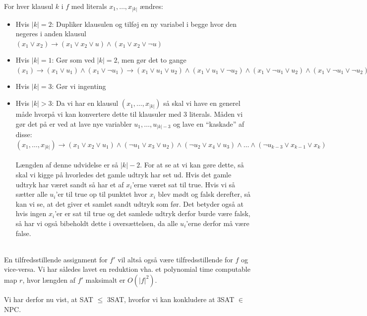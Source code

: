 For hver klausul $k$ i $f$ med literals $x_1, \hdots, x_{|k|}$ ændres:
\begin{itemize}
\item Hvis $|k| = 2$: Dupliker klausulen og tilføj en ny variabel i
begge hvor den negeres i anden klausul \\ $(x_1 \vee x_2) \rightarrow
(x_1 \vee x_2 \vee u) \wedge (x_1 \vee x_2 \vee \neg u)$
\item Hvis $|k| = 1$: Gør som ved $|k| = 2$, men gør det to gange \\
  $(x_1) \rightarrow (x_1 \vee u_1) \wedge (x_1 \vee \neg u_1)
  \rightarrow (x_1 \vee u_1 \vee u_2) \wedge (x_1 \vee u_1 \vee \neg
  u_2) \wedge (x_1 \vee \neg u_1 \vee u_2) \wedge (x_1 \vee \neg u_1
  \vee \neg u_2)$
\item Hvis $|k| = 3$: Gør vi ingenting
\item Hvis $|k| > 3$: Da vi har en klausul $(x_1,\hdots,x_{|k|})$ så
  skal vi have en generel måde hvorpå vi kan konvertere dette til
  klausuler med 3 literals. Måden vi gør det på er ved at lave nye
  variabler $u_1,\hdots,u_{|k|-3}$ og lave en ``kaskade'' af disse:\\
  $(x_1,\hdots,x_{|k|}) \rightarrow (x_1 \vee x_2 \vee u_1) \wedge
  (\neg u_1 \vee x_3 \vee u_2) \wedge (\neg u_2 \vee x_4 \vee u_3 )
  \wedge
  \hdots \wedge (\neg u_{k-3} \vee x_{k-1} \vee x_{k} ) $ \\
  ~\\
  Længden af denne udvidelse er så $|k|-2$.  For at se at vi kan gøre
  dette, så skal vi kigge på hvorledes det gamle udtryk har set
  ud. Hvis det gamle udtryk har været sandt så har et af $x_i$'erne
  været sat til true. Hvis vi så sætter alle $u_i$'er til true op til
  punktet hvor $x_i$ blev mødt og falsk derefter, så kan vi se, at det
  giver et samlet sandt udtryk som før. Det betyder også at hvis ingen
  $x_i$'er er sat til true og det samlede udtryk derfor burde være
  falsk, så har vi også bibeholdt dette i oversættelsen, da
  alle $u_i$'erne derfor må være false.\\
  ~\\
\end{itemize} 

En tilfredsstillende assignment for $f'$ vil altså også være
tilfredsstillende for $f$ og vice-versa. Vi har således lavet en
reduktion vha. et polynomial time computable map $r$, hvor længden af
$f'$ maksimalt er $O(|f|^2)$.

Vi har derfor nu vist, at SAT $\leq$ 3SAT, hvorfor vi kan konkludere
at 3SAT $\in$ NPC.

